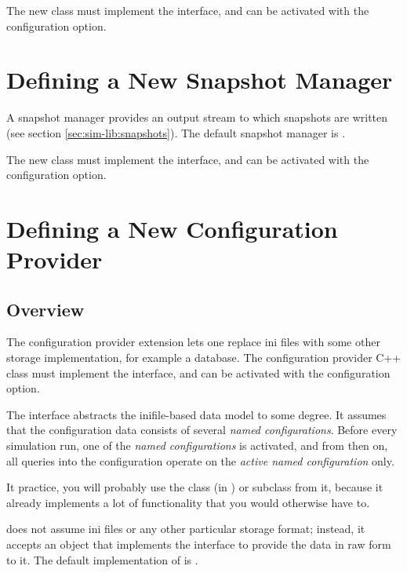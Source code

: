 The new class must implement the  interface,
and can be activated with the  configuration
option.


\section{Defining a New Snapshot Manager}
\label{sec:plugin-exts:snapshotmanager}

A snapshot manager provides an output stream to which snapshots are written
(see section \ref{sec:sim-lib:snapshots}). The default snapshot manager
is .

The new class must implement the  interface, and
can be activated with the  configuration
option.


\section{Defining a New Configuration Provider}
\label{sec:plugin-exts:configuration-providers}

\subsection{Overview}
\label{sec:plugin-exts:configprovider-overview}

The configuration provider extension lets one replace ini files
with some other storage implementation, for example a database.
The configuration provider C++ class must implement the
 interface, and can be activated with
the  configuration option.

The  interface abstracts the inifile-based
data model to some degree. It assumes that the configuration data
consists of several \textit{named configurations}. Before every
simulation run, one of the \textit{named configurations} is
activated, and from then on, all queries into the configuration
operate on the \textit{active named configuration} only.

It practice, you will probably use the 
class (in ) or subclass from it, because it already
implements a lot of functionality that you would otherwise have to.

 does not assume ini files or
any other particular storage format; instead, it accepts
an object that implements the 
interface to provide the data in raw form to it.
The default implementation of  is
.

